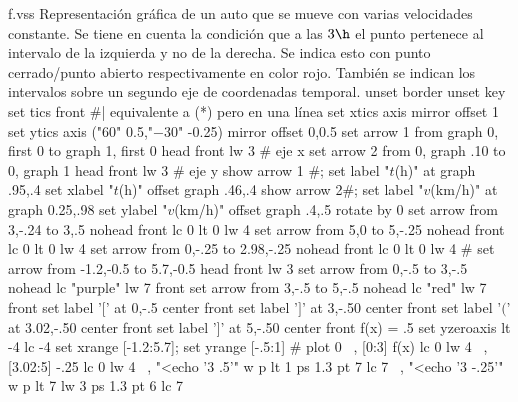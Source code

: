 \begin{plot}{.9}{f.vss}
  {Representación gráfica de un auto que se mueve con varias velocidades
  constante. Se tiene en cuenta la condición que a las $3\h$ el punto pertenece
  al intervalo de la izquierda y no de la derecha. Se indica esto con punto
  cerrado/punto abierto respectivamente en color rojo. También se indican los
  intervalos sobre un segundo eje de coordenadas temporal.
  }
  unset border
  unset key
  set tics front    #| equivalente a (*) pero en una línea
  set xtics axis mirror offset 1
  set ytics axis ("$60$" 0.5,"$-30$" -0.25) mirror offset 0,0.5
  set arrow 1 from graph 0, first 0 to graph 1, first 0 head front lw 3 # eje x
  set arrow 2 from 0, graph .10 to 0, graph 1 head front lw 3		# eje y 
  show arrow 1 #; set label "$t$(h)" at graph .95,.4
  set xlabel "$t$(h)" offset  graph .46,.4
  show arrow 2#; set label "$v$(km/h)" at graph 0.25,.98 
  set ylabel "$v$(km/h)" offset graph .4,.5 rotate by 0
  set arrow from 3,-.24 to 3,.5 nohead front lc 0 lt 0 lw 4
  set arrow from 5,0 to 5,-.25 nohead front lc 0 lt 0 lw 4
  set arrow from 0,-.25 to 2.98,-.25 nohead front lc 0 lt 0 lw 4
  #
  set arrow from -1.2,-0.5 to 5.7,-0.5 head front lw 3
  set arrow from 0,-.5 to 3,-.5 nohead lc "purple" lw 7 front
  set arrow from 3,-.5 to 5,-.5 nohead lc "red" lw 7 front
  set label '$[$' at 0,-.5 center front 
  set label '$]$' at 3,-.50 center front 
  set label '$($' at 3.02,-.50 center front 
  set label '$]$' at 5,-.50 center front 
  f(x) = .5
  set yzeroaxis lt -4 lc -4
  set xrange [-1.2:5.7]; set yrange [-.5:1]
  #
  plot 0 \
  , [0:3] f(x) lc 0 lw 4 \
  , [3.02:5] -.25 lc 0 lw 4 \
  , "<echo '3 .5'" w p lt 1 ps 1.3 pt 7 lc 7 \
  , "<echo '3 -.25'" w p lt 7 lw 3 ps 1.3 pt 6 lc 7 \
\end{plot}

